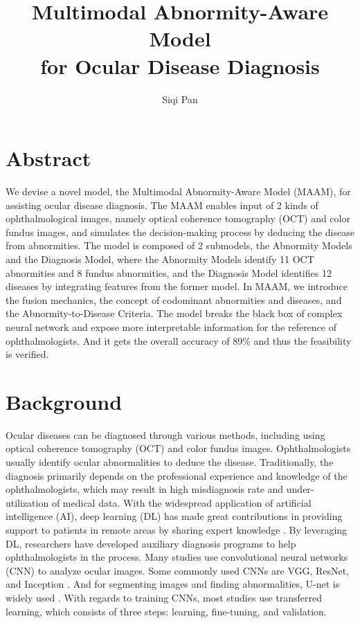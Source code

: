 \documentclass{article}
\begin{document}
	\title{\vspace{-2.25cm} Multimodal Abnormity-Aware Model\\for Ocular Disease Diagnosis}
	\author{Siqi Pan}
	\date{}
	\maketitle
	
	\section*{Abstract}
	
	We devise a novel model, the Multimodal Abnormity-Aware Model (MAAM), for assisting ocular disease diagnosis. The MAAM enables input of 2 kinds of ophthalmological images, namely optical coherence tomography (OCT) and color fundus images, and simulates the decision-making process by deducing the disease from abnormities. The model is composed of 2 submodels, the Abnormity Models and the Diagnosis Model, where the Abnormity Models identify 11 OCT abnormities and 8 fundus abnormities, and the Diagnosis Model identifies 12 diseases by integrating features from the former model. In MAAM, we introduce the fusion mechanics, the concept of codominant abnormities and diseases, and the Abnormity-to-Disease Criteria.  The model breaks the black box of complex neural network and expose more interpretable information for the reference of ophthalmologists. And it gets the overall accuracy of 89\% and thus the feasibility is verified.
	
	\section{Background}
	Ocular diseases can be diagnosed through various methods, including using optical coherence tomography (OCT) and color fundus images. Ophthalmologists usually identify ocular abnormalities to deduce the disease. Traditionally, the diagnosis primarily depends on the professional experience and knowledge of the ophthalmologists, which may result in high misdiagnosis rate and under-utilization of medical data. With the widespread application of artificial intelligence (AI), deep learning (DL) has made great contributions in providing support to patients in remote areas by sharing expert knowledge \autocite{Ichhpujani_Thakur_2021}. By leveraging DL, researchers have developed auxiliary diagnosis programs to help ophthalmologists in the process. Many studies use convolutional neural networks (CNN) to analyze ocular images. Some commonly used CNNs are VGG, ResNet, and Inception \autocite{daich2023artificial}. And for segmenting images and finding abnormalities, U-net is widely used \autocite{Ronneberger_Fischer_Brox_2015}. With regards to training CNNs, most studies use transferred learning, which consists of three steps: learning, fine-tuning, and validation.
	
\end{document}
